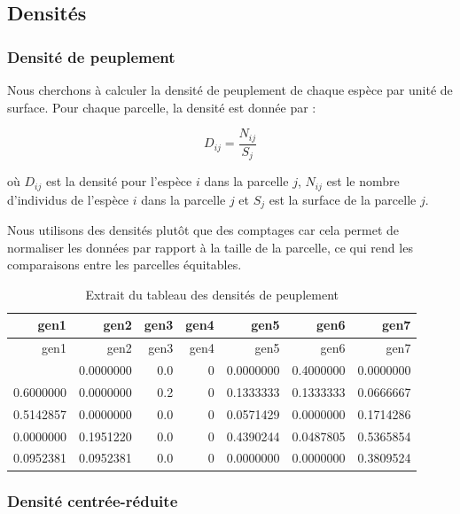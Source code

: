 \documentclass[
]{article}
\begin{document}
\hypertarget{densituxe9s}{%
\subsection{Densités}\label{densituxe9s}}

\hypertarget{densituxe9-de-peuplement}{%
\subsubsection{Densité de peuplement}\label{densituxe9-de-peuplement}}

Nous cherchons à calculer la densité de peuplement de chaque espèce par
unité de surface. Pour chaque parcelle, la densité est donnée par :

\[
D_{ij} = \frac{N_{ij}}{S_{j}}
\]

où \(D_{ij}\) est la densité pour l'espèce \(i\) dans la parcelle \(j\),
\(N_{ij}\) est le nombre d'individus de l'espèce \(i\) dans la parcelle
\(j\) et \(S_{j}\) est la surface de la parcelle \(j\).

Nous utilisons des densités plutôt que des comptages car cela permet de
normaliser les données par rapport à la taille de la parcelle, ce qui
rend les comparaisons entre les parcelles équitables.

\begin{longtable}[]{@{}rrrrrrr@{}}
\caption{Extrait du tableau des densités de peuplement}\tabularnewline
\toprule\noalign{}
gen1 & gen2 & gen3 & gen4 & gen5 & gen6 & gen7 \\
\midrule\noalign{}
\endfirsthead
\toprule\noalign{}
gen1 & gen2 & gen3 & gen4 & gen5 & gen6 & gen7 \\
\midrule\noalign{}
\endhead
\bottomrule\noalign{}
\endlastfoot
0.0000000 & 0.0000000 & 0.0 & 0 & 0.0000000 & 0.4000000 & 0.0000000 \\
0.6000000 & 0.0000000 & 0.2 & 0 & 0.1333333 & 0.1333333 & 0.0666667 \\
0.5142857 & 0.0000000 & 0.0 & 0 & 0.0571429 & 0.0000000 & 0.1714286 \\
0.0000000 & 0.1951220 & 0.0 & 0 & 0.4390244 & 0.0487805 & 0.5365854 \\
0.0952381 & 0.0952381 & 0.0 & 0 & 0.0000000 & 0.0000000 & 0.3809524 \\
\end{longtable}

\hypertarget{densituxe9-centruxe9e-ruxe9duite}{%
\subsubsection{Densité
centrée-réduite}\label{densituxe9-centruxe9e-ruxe9duite}}
\end{document}
